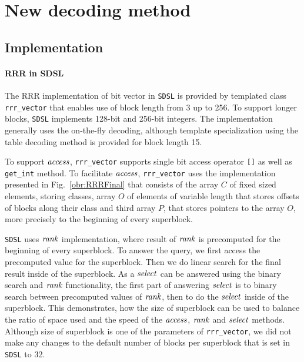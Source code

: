 \section{New decoding method}

\subsection{Implementation}

\paragraph{RRR in SDSL}

The RRR implementation of bit vector in \texttt{SDSL} is provided by templated class \verb'rrr_vector'
that enables use of block length from 3 up to 256. To support longer blocks,
\texttt{SDSL} implements 128-bit and 256-bit integers. The implementation generally uses the
on-the-fly decoding, although template specialization using the table decoding method is provided
for block length 15.

To support $\mathit{access}$, \verb'rrr_vector' supports single bit access operator \verb'[]' as well
as \verb'get_int' method. To facilitate $\mathit{access}$, \verb'rrr_vector' uses the implementation
presented in Fig.~\ref{obr:RRRFinal} that consists of the array $C$ of fixed sized elements, storing
classes, array $O$ of elements of variable length that stores offsets of blocks along their class and
third array $P$, that stores pointers to the array $O$, more precisely to the beginning of every superblock.

\texttt{SDSL} uses $\mathit{rank}$ implementation, where result of $\mathit{rank}$ is precomputed for the beginning
of every superblock. To answer the query, we first access the precomputed value for the superblock. Then
we do linear search for the final result inside of the superblock. As a $\mathit{select}$ can be answered
using the binary search and $\mathit{rank}$ functionality, the first part of answering $\mathit{select}$ is to binary
search between precomputed values of $\mathit{rank}$, then to do the $\mathit{select}$ inside of the superblock. This
demonstrates, how the size of superblock can be used to balance the ratio of space used and the speed
of the $\mathit{access}$, $\mathit{rank}$ and $\mathit{select}$ methods. Although size of superblock is one of the parameters
of \verb'rrr_vector', we did not make any changes to the default number of blocks per superblock that
is set in \texttt{SDSL} to 32.

